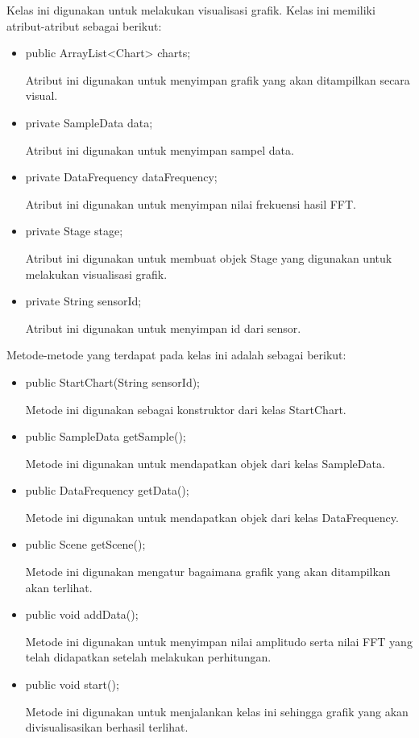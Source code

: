 Kelas ini digunakan untuk melakukan visualisasi grafik. Kelas ini memiliki atribut-atribut sebagai berikut:
\begin{itemize}
    \item public ArrayList<Chart> charts;
    
    Atribut ini digunakan untuk menyimpan grafik yang akan ditampilkan secara visual.
    
    \item private SampleData data;
    
    Atribut ini digunakan untuk menyimpan sampel data.
    
    \item private DataFrequency dataFrequency;
    
    Atribut ini digunakan untuk menyimpan nilai frekuensi hasil FFT.
    
    \item private Stage stage;
    
    Atribut ini digunakan untuk membuat objek Stage yang digunakan untuk melakukan visualisasi grafik.
    
    \item private String sensorId;
    
    Atribut ini digunakan untuk menyimpan id dari sensor.
\end{itemize}

Metode-metode yang terdapat pada kelas ini adalah sebagai berikut:
\begin{itemize}
    \item public StartChart(String sensorId);
    
    Metode ini digunakan sebagai konstruktor dari kelas StartChart.
    
    \item public SampleData getSample();
    
    Metode ini digunakan untuk mendapatkan objek dari kelas SampleData.
    
    \item public DataFrequency getData();
    
    Metode ini digunakan untuk mendapatkan objek dari kelas DataFrequency.
    
    \item public Scene getScene();
    
    Metode ini digunakan mengatur bagaimana grafik yang akan ditampilkan akan terlihat.
    
    \item public void addData();
    
    Metode ini digunakan untuk menyimpan nilai amplitudo serta nilai FFT yang telah didapatkan setelah melakukan perhitungan.
    
    \item public void start();
    
    Metode ini digunakan untuk menjalankan kelas ini sehingga grafik yang akan divisualisasikan berhasil terlihat.
\end{itemize}


